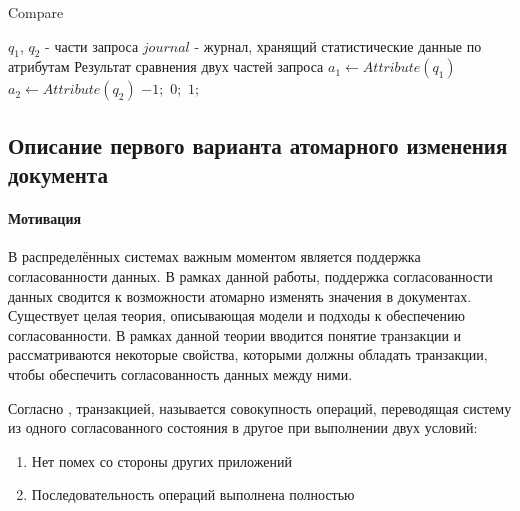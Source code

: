 \documentclass{matmex-diploma}
\begin{document}
        \begin{algorithm}[H]                   
        \caption{Compare}              
        \label{cmp1}                        
            \begin{algorithmic}        
                \REQUIRE $q_1$, $q_2$ - части запроса $journal$ - журнал, хранящий статистические данные по атрибутам
                \ENSURE Результат сравнения двух частей запроса
                \STATE $a_1 \leftarrow Attribute(q_1)$
                \STATE $a_2 \leftarrow Attribute(q_2)$
                    \RETURN $-1;$
                \ELSE 
                        \RETURN $0;$
                    \ELSE
                        \RETURN $1;$
                    \ENDIF
                \ENDIF
            \end{algorithmic}
        \end{algorithm}
        
    \subsection{Описание первого варианта атомарного изменения документа}
        \paragraph{Мотивация} В распределённых системах важным моментом является поддержка согласованности данных. В рамках данной работы, поддержка согласованности данных сводится к возможности атомарно изменять значения в документах. Существует целая теория, описывающая модели и подходы к обеспечению согласованности. В рамках данной теории вводится понятие транзакции и рассматриваются некоторые свойства, которыми должны обладать транзакции, чтобы обеспечить согласованность данных между ними. 
        
        Согласно \cite{novikov}, транзакцией, называется совокупность операций, переводящая систему из одного согласованного состояния в другое при выполнении двух условий:
        \begin{enumerate}
            \item Нет помех со стороны других приложений
            \item Последовательность операций выполнена полностью
        \end{enumerate}
        
\end{document}
